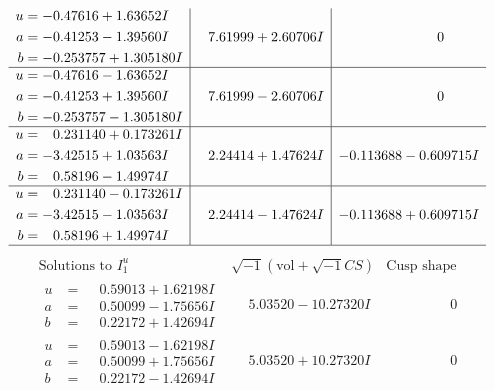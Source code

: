 \documentclass[1p]{elsarticle_modified}
\theoremstyle{definition}
\newcommand{\I}{\sqrt{-1}}
\begin{document}
$$\begin{array}{c|c|c}
\begin{aligned}
u &= -0.47616 + 1.63652 I \\
a &= -0.41253 - 1.39560 I \\
b &= -0.253757 + 1.305180 I\end{aligned}
 & \phantom{-}7.61999 + 2.60706 I & \phantom{-0.000000 } 0 \\ \hline\begin{aligned}
u &= -0.47616 - 1.63652 I \\
a &= -0.41253 + 1.39560 I \\
b &= -0.253757 - 1.305180 I\end{aligned}
 & \phantom{-}7.61999 - 2.60706 I & \phantom{-0.000000 } 0 \\ \hline\begin{aligned}
u &= \phantom{-}0.231140 + 0.173261 I \\
a &= -3.42515 + 1.03563 I \\
b &= \phantom{-}0.58196 - 1.49974 I\end{aligned}
 & \phantom{-}2.24414 + 1.47624 I & -0.113688 - 0.609715 I \\ \hline\begin{aligned}
u &= \phantom{-}0.231140 - 0.173261 I \\
a &= -3.42515 - 1.03563 I \\
b &= \phantom{-}0.58196 + 1.49974 I\end{aligned}
 & \phantom{-}2.24414 - 1.47624 I & -0.113688 + 0.609715 I\\
 \hline 
 \end{array}$$\newpage$$\begin{array}{c|c|c}  
\text{Solutions to }I^u_{1}& \I (\text{vol} + \sqrt{-1}CS) & \text{Cusp shape}\\
 \hline 
\begin{aligned}
u &= \phantom{-}0.59013 + 1.62198 I \\
a &= \phantom{-}0.50099 - 1.75656 I \\
b &= \phantom{-}0.22172 + 1.42694 I\end{aligned}
 & \phantom{-}5.03520 - 10.27320 I & \phantom{-0.000000 } 0 \\ \hline\begin{aligned}
u &= \phantom{-}0.59013 - 1.62198 I \\
a &= \phantom{-}0.50099 + 1.75656 I \\
b &= \phantom{-}0.22172 - 1.42694 I\end{aligned}
 & \phantom{-}5.03520 + 10.27320 I & \phantom{-0.000000 } 0 \\ \hline\begin{aligned}

\end{aligned}
\end{array}$$
\end{document}

